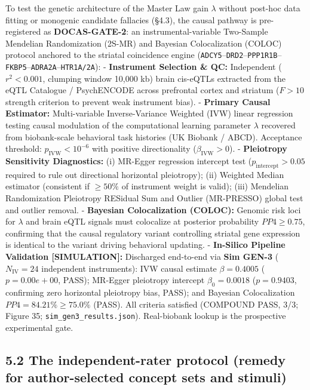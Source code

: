 \documentclass[
]{article}
\begin{document}
To test the genetic architecture of the Master Law gain \(\lambda\)
without post-hoc data fitting or monogenic candidate fallacies (§4.3),
the causal pathway is pre-registered as \textbf{DOCAS-GATE-2}: an
instrumental-variable Two-Sample Mendelian Randomization (2S-MR) and
Bayesian Colocalization (COLOC) protocol anchored to the striatal
coincidence engine
(\texttt{ADCY5}--\texttt{DRD2}--\texttt{PPP1R1B}--\texttt{FKBP5}--\texttt{ADRA2A}--\texttt{HTR1A/2A}):
- \textbf{Instrument Selection \& QC:} Independent (\(r^2 < 0.001\),
clumping window 10,000 kb) brain cis-eQTLs extracted from the eQTL
Catalogue / PsychENCODE across prefrontal cortex and striatum
(\(F > 10\) strength criterion to prevent weak instrument bias). -
\textbf{Primary Causal Estimator:} Multi-variable Inverse-Variance
Weighted (IVW) linear regression testing causal modulation of the
computational learning parameter \(\lambda\) recovered from
biobank-scale behavioral task histories (UK Biobank / ABCD). Acceptance
threshold: \(p_{\mathrm{IVW}} < 10^{-6}\) with positive directionality
(\(\beta_{\mathrm{IVW}} > 0\)). - \textbf{Pleiotropy Sensitivity
Diagnostics:} (i) MR-Egger regression intercept test
(\(p_{\mathrm{intercept}} > 0.05\) required to rule out directional
horizontal pleiotropy); (ii) Weighted Median estimator (consistent if
\(\ge 50\%\) of instrument weight is valid); (iii) Mendelian
Randomization Pleiotropy RESidual Sum and Outlier (MR-PRESSO) global
test and outlier removal. - \textbf{Bayesian Colocalization (COLOC):}
Genomic risk loci for \(\lambda\) and brain eQTL signals must colocalize
at posterior probability \(PP4 \ge 0.75\), confirming that the causal
regulatory variant controlling striatal gene expression is identical to
the variant driving behavioral updating. - \textbf{In-Silico Pipeline
Validation {[}SIMULATION{]}:} Discharged end-to-end via \textbf{Sim
GEN-3} (\(N_{\mathrm{IV}} = 24\) independent instruments): IVW causal
estimate \(\beta = 0.4005\) (\(p = 0.00e+00\), PASS); MR-Egger
pleiotropy intercept \(\beta_0 = 0.0018\) (\(p = 0.9403\), confirming
zero horizontal pleiotropy bias, PASS); and Bayesian Colocalization
\(PP4 = 84.21\% \ge 75.0\%\) (PASS). All criteria satisfied (COMPOUND
PASS, 3/3; Figure 35; \texttt{sim\_gen3\_results.json}). Real-biobank
lookup is the prospective experimental gate.

\subsection{5.2 The independent-rater protocol (remedy for
author-selected concept sets and
stimuli)}\label{the-independent-rater-protocol-remedy-for-author-selected-concept-sets-and-stimuli}
\end{document}
